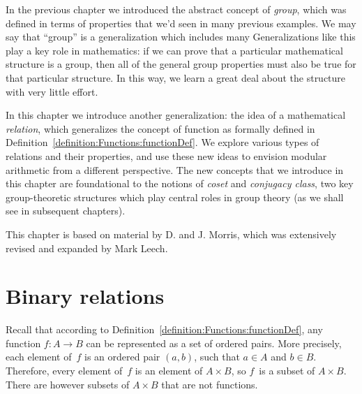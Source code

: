 


\medskip\noindent

In the previous chapter we introduced the abstract concept of \emph{group}, which was defined in terms of properties that we'd seen in many previous examples. We may say that ``group'' is a generalization which includes many Generalizations like this play a key role in mathematics: if we can prove that a particular  mathematical structure is a group, then all  of the general group properties must also be true for that particular structure. In this way, we learn a great deal about the structure with very little effort.

In this chapter we introduce another generalization:  the idea of a mathematical \emph{relation}, which generalizes the concept of function as formally defined in Definition~\ref{definition:Functions:functionDef}. We explore various types of relations and their properties, and use these new ideas to envision modular arithmetic from a different perspective. The new concepts that we introduce in this chapter are foundational to the notions of \emph{coset} and \emph{conjugacy  class}, two key group-theoretic structures which play central roles in group theory (as we shall see in subsequent chapters).
\medskip

This chapter  is based on material by  D. and J. Morris, which was extensively revised and expanded by Mark Leech.

\section{Binary relations \quad
{}} 
\label{sec:EquivalenceRelations:BinaryRelation}

Recall that according to Definition~\ref{definition:Functions:functionDef}, any function $f \colon A \to B$ can be represented as a set of ordered pairs. More precisely, each element of~$f$ is an ordered pair $(a,b)$, such that $a \in A$ and $b \in B$. Therefore, every element of~$f$ is an element of $A \times B$, so $f$~is a subset of $A \times B$.
There are however subsets of $A \times B$ that are not functions.


